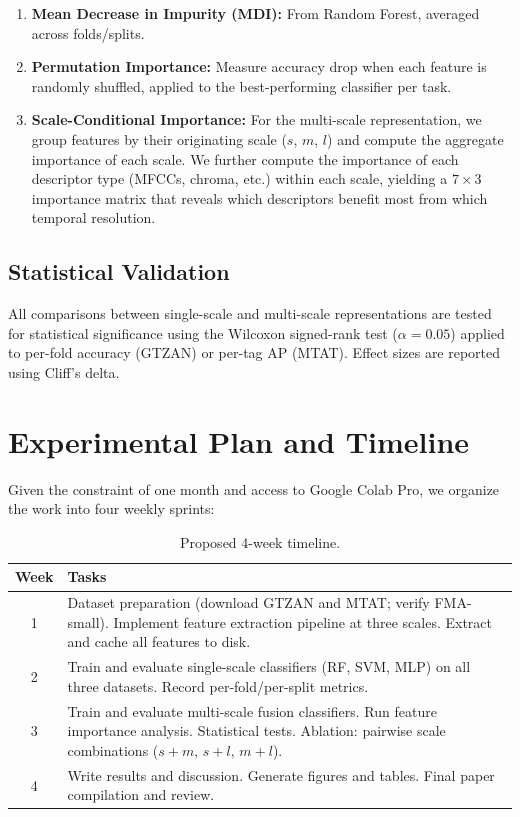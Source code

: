 \documentclass[conference]{IEEEtran}
\begin{document}
\begin{enumerate}
    \item \textbf{Mean Decrease in Impurity (MDI):} From Random Forest, averaged across folds/splits.
    \item \textbf{Permutation Importance:} Measure accuracy drop when each feature is randomly shuffled, applied to the best-performing classifier per task.
    \item \textbf{Scale-Conditional Importance:} For the multi-scale representation, we group features by their originating scale ($s$, $m$, $l$) and compute the aggregate importance of each scale. We further compute the importance of each descriptor type (MFCCs, chroma, etc.) within each scale, yielding a $7 \times 3$ importance matrix that reveals which descriptors benefit most from which temporal resolution.
\end{enumerate}

\subsection{Statistical Validation}

All comparisons between single-scale and multi-scale representations are tested for statistical significance using the Wilcoxon signed-rank test ($\alpha = 0.05$) applied to per-fold accuracy (GTZAN) or per-tag AP (MTAT).
Effect sizes are reported using Cliff's delta.

\section{Experimental Plan and Timeline}

Given the constraint of one month and access to Google Colab Pro, we organize the work into four weekly sprints:

\begin{table}[t]
\centering
\caption{Proposed 4-week timeline.}
\label{tab:timeline}
\begin{tabular}{@{}cp{6.2cm}@{}}
\toprule
\textbf{Week} & \textbf{Tasks} \\
\midrule
1 & Dataset preparation (download GTZAN and MTAT; verify FMA-small). Implement feature extraction pipeline at three scales. Extract and cache all features to disk. \\
\midrule
2 & Train and evaluate single-scale classifiers (RF, SVM, MLP) on all three datasets. Record per-fold/per-split metrics. \\
\midrule
3 & Train and evaluate multi-scale fusion classifiers. Run feature importance analysis. Statistical tests. Ablation: pairwise scale combinations ($s{+}m$, $s{+}l$, $m{+}l$). \\
\midrule
4 & Write results and discussion. Generate figures and tables. Final paper compilation and review. \\
\bottomrule
\end{tabular}
\end{table}
\end{document}
